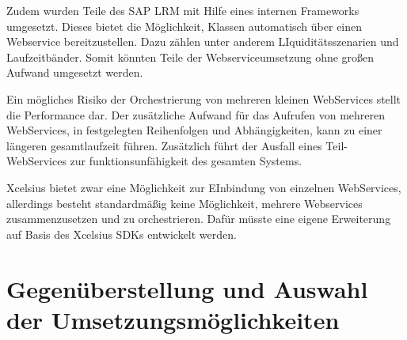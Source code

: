 Zudem wurden Teile des SAP LRM mit Hilfe eines internen Frameworks umgesetzt. Dieses bietet die Möglichkeit, Klassen automatisch über einen Webservice bereitzustellen. Dazu zählen unter anderem LIquiditätsszenarien und Laufzeitbänder. Somit könnten Teile der Webserviceumsetzung ohne großen Aufwand umgesetzt werden.

Ein mögliches Risiko der Orchestrierung von mehreren kleinen WebServices stellt die Performance dar. Der zusätzliche Aufwand für das Aufrufen von mehreren WebServices, in festgelegten Reihenfolgen und Abhängigkeiten, kann zu einer längeren gesamtlaufzeit führen. Zusätzlich führt der Ausfall eines Teil-WebServices zur funktionsunfähigkeit des gesamten Systems.

Xcelsius bietet zwar eine Möglichkeit zur EInbindung von einzelnen WebServices, allerdings besteht standardmäßig keine Möglichkeit, mehrere Webservices zusammenzusetzen und zu orchestrieren. Dafür müsste eine eigene Erweiterung auf Basis des Xcelsius SDKs entwickelt werden.

\section{Gegenüberstellung und Auswahl der Umsetzungsmöglichkeiten}


